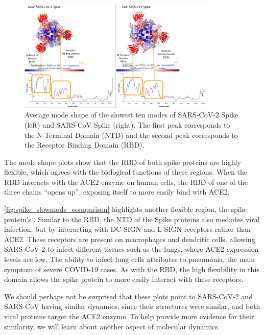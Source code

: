 \begin{figure}[h]
	\centering
	\mySfFamily
	\includegraphics[width = 0.85\textwidth]{../images/spike_slowmode_comparison.png}
	\caption{Average mode shape of the slowest ten modes of SARS-CoV-2 Spike (left) and SARS-CoV Spike (right). The first peak corresponds to the N-Terminal Domain (NTD) and the second peak corresponds to the Receptor Binding Domain (RBD).}
	\label{fig:spike_slowmode_comparison}
\end{figure}

The mode shape plots show that the RBD of both spike proteins are highly flexible, which agrees with the biological functions of these regions. When the RBD interacts with the ACE2 enzyme on human cells, the RBD of one of the three chains ``opens up'', exposing itself to more easily bind with ACE2.

\autoref{fig:spike_slowmode_comparison} highlights another flexible region, the spike protein's . Similar to the RBD, the NTD of the Spike proteins also mediates viral infection, but by interacting with DC-SIGN and L-SIGN receptors rather than ACE2. These receptors are present on macrophages and dendritic cells, allowing SARS-CoV-2 to infect different tissues such as the lungs, where ACE2 expression levels are low. The ability to infect lung cells attributes to pneumonia, the main symptom of severe COVID-19 cases. As with the RBD, the high flexibility in this domain allows the spike protein to more easily interact with these receptors.

We should perhaps not be surprised that these plots point to SARS-CoV-2 and SARS-CoV having similar dynamics, since their structures were similar, and both viral proteins target the ACE2 enzyme. To help provide more evidence for their similarity, we will learn about another aspect of molecular dynamics.

\FloatBarrier
{}
